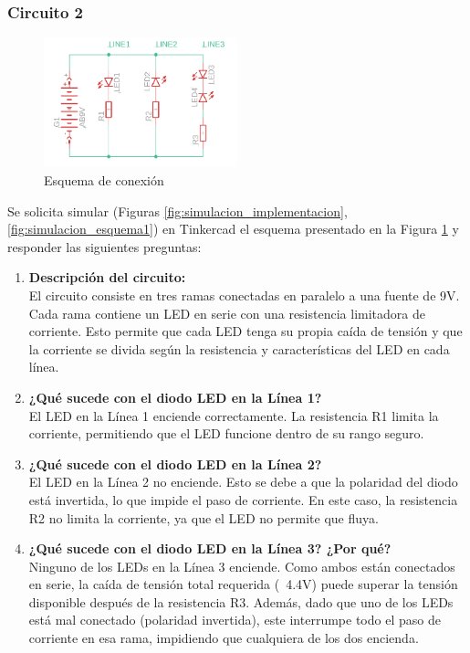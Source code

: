 \documentclass{article}
\begin{document}
\subsubsection{Circuito 2}

\begin{figure}[H]
    \centering
    \includegraphics[width=0.5\textwidth]{./img/ckpt_2_3_0.png}
    \caption{Esquema de conexión}
    \label{fig:circuito_2}
\end{figure}

Se solicita simular (Figuras \ref{fig:simulacion_implementacion}, \ref{fig:simulacion_esquema1}) en Tinkercad el esquema presentado en la Figura \ref{fig:circuito_2} y responder las siguientes preguntas:

\begin{enumerate}
    \item \textbf{Descripción del circuito:} \\
    El circuito consiste en tres ramas conectadas en paralelo a una fuente de 9V. Cada rama contiene un LED en serie con una resistencia limitadora de corriente. Esto permite que cada LED tenga su propia ca\'ida de tensión y que la corriente se divida según la resistencia y caracter\'isticas del LED en cada l\'inea.

    \item \textbf{¿Qué sucede con el diodo LED en la L\'inea 1?} \\
    El LED en la L\'inea 1 enciende correctamente. La resistencia R1 limita la corriente, permitiendo que el LED funcione dentro de su rango seguro.

    \item \textbf{¿Qué sucede con el diodo LED en la L\'inea 2?} \\
    El LED en la L\'inea 2 no enciende. Esto se debe a que la polaridad del diodo est\'a invertida, lo que impide el paso de corriente. En este caso, la resistencia R2 no limita la corriente, ya que el LED no permite que fluya.

    \item \textbf{¿Qué sucede con el diodo LED en la L\'inea 3? ¿Por qué?} \\
    Ninguno de los LEDs en la L\'inea 3 enciende. Como ambos est\'an conectados en serie, la ca\'ida de tensión total requerida (~4.4V) puede superar la tensión disponible después de la resistencia R3. Adem\'as, dado que uno de los LEDs est\'a mal conectado (polaridad invertida), este interrumpe todo el paso de corriente en esa rama, impidiendo que cualquiera de los dos encienda.
\end{enumerate}
\end{document}
